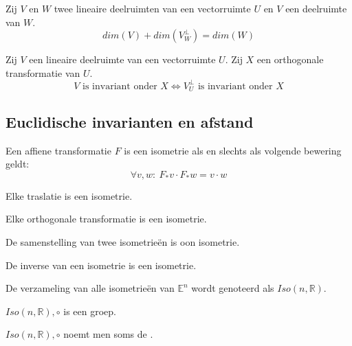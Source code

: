 \documentclass[main.tex]{subfiles}
\begin{document}
\begin{st}
  Zij $V$ en $W$ twee lineaire deelruimten van een vectorruimte $U$ en $V$ een deelruimte van $W$.
  \[ dim(V) + dim(V^{\bot}_{W}) = dim(W) \]
\end{st}

\begin{st}
  Zij $V$ een lineaire deelruimte van een vectorruimte $U$.
  Zij $X$ een orthogonale transformatie van $U$.
  \[ V \text{ is invariant onder } X \Leftrightarrow V^{\bot}_{U} \text{ is invariant onder } X \]
\end{st}

\subsection{Euclidische invarianten en afstand}
\label{sec:eucl-invar-en}

\begin{st}
  Een affiene transformatie $F$ is een isometrie als en slechts als volgende bewering geldt:
  \[ \forall v,w:\ F_{*}v \cdot F_{*}w = v \cdot w \]
\end{st}

\begin{st}
  Elke traslatie is een isometrie.
\end{st}

\begin{st}
  Elke orthogonale transformatie is een isometrie.
\end{st}

\begin{st}
  De samenstelling van twee isometrie\"en is oon isometrie.
\end{st}

\begin{st}
  De inverse van een isometrie is een isometrie.
\end{st}

\begin{de}
  De verzameling van alle isometrie\"en van $\mathbb{E}^{n}$ wordt genoteerd als $Iso(n,\mathbb{R})$.
\end{de}

\begin{st}
  $Iso(n,\mathbb{R}),\circ$ is een groep.
\end{st}

\begin{de}
  $Iso(n,\mathbb{R}),\circ$ noemt men soms de .
\end{de}
\end{document}
